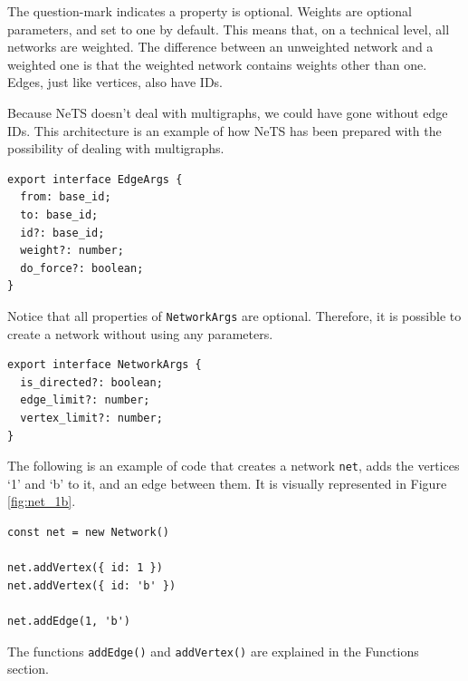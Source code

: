 The question-mark indicates a property is optional.
Weights are optional parameters, and set to one by default.
This means that, on a technical level, all networks are weighted.
The difference between an unweighted network and a weighted one
is that the weighted network contains weights other than one.
Edges, just like vertices, also have IDs.

Because NeTS doesn't deal with multigraphs, we
could have gone without edge IDs.
This architecture is an example of how NeTS
has been prepared with the possibility of dealing
with multigraphs.

\begin{verbatim}
export interface EdgeArgs {
  from: base_id;
  to: base_id;
  id?: base_id;
  weight?: number;
  do_force?: boolean;
}
\end{verbatim}

Notice that all properties of \texttt{NetworkArgs} are optional.
Therefore, it is possible to create a network without using any parameters.

\begin{verbatim}
export interface NetworkArgs {
  is_directed?: boolean;
  edge_limit?: number;
  vertex_limit?: number;
}
\end{verbatim}

The following is an example of code that creates a network \texttt{net},
adds the vertices `1' and `b' to it, and an edge between them.
It is visually represented in Figure \ref{fig:net_1b}.

\begin{verbatim}
const net = new Network()

net.addVertex({ id: 1 })
net.addVertex({ id: 'b' })

net.addEdge(1, 'b')
\end{verbatim}

The functions \texttt{addEdge()} and \texttt{addVertex()}
are explained in the Functions section.

